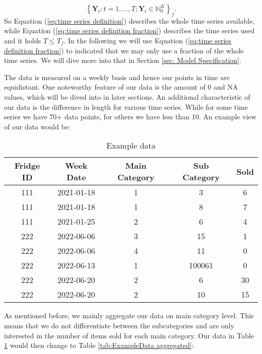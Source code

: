 \begin{equation}
\left\{\bm{Y}_t:t=1,\ldots,T; \bm{Y}_t \in \mathbb{N}_0^K \right\}_f.
\label{eq:time series definition fraction}
\end{equation}
%
So Equation (\ref{eq:time series definition}) describes the whole time series available, while Equation (\ref{eq:time series definition fraction}) describes the time series used and it holds $T\leq T_f$. In the following we will use Equation (\ref{eq:time series definition fraction}) to indicated that we may only use a fraction of the whole time series. We will dive more into that in Section \ref{sec: Model Specification}.

The data is measured on a weekly basis and hence our points in time are equidistant. One noteworthy feature of our data is the amount of 0 and NA values, which will be dived into in later sections. An additional characteristic of our data is the difference in length for various time series. While for some time series we have 70+ data points, for others we have less than 10. An example view of our data would be: 

\begin{table}[h!]
\centering
\begin{tabular}{ccccc}
\hline
\rowcolor[HTML]{FFFFFF} 
\textbf{Fridge ID} & \textbf{Week Date} & \textbf{Main Category} & \textbf{Sub Category} & \textbf{Sold} \\ \hline
111                & 2021-01-18         & 1                      & 3                     & 6             \\
111                & 2021-01-18         & 1                      & 8                     & 7             \\
111                & 2021-01-25         & 2                      & 6                     & 4             \\
222                & 2022-06-06         & 3                      & 15                    & 1             \\
222                & 2022-06-06         & 4                      & 11                    & 0             \\
222                & 2022-06-13         & 1                      & 100061                & 0             \\
222                & 2022-06-20         & 2                      & 6                     & 30            \\
222                & 2022-06-20         & 2                      & 10                    & 15            \\ \hline
\end{tabular}
\caption{Example data}
\label{tab:ExampleData}
\end{table}
%
As mentioned before, we mainly aggregate our data on main category level. This means that we do not differentiate between the subcategories and are only interested in the number of items sold for each main category. Our data in Table \ref{tab:ExampleData} would then change to Table \ref{tab:ExampleData aggregated}:

